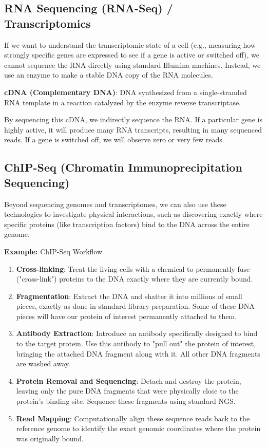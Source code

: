 \subsection{RNA Sequencing (RNA-Seq) / Transcriptomics}
If we want to understand the transcriptomic state of a cell (e.g., measuring how strongly specific genes are expressed to see if a gene is active or switched off), we cannot sequence the RNA directly using standard Illumina machines. 
Instead, we use an enzyme to make a stable DNA copy of the RNA molecules.

\begin{important}
  \textbf{cDNA (Complementary DNA)}: DNA synthesized from a single-stranded RNA template in a reaction catalyzed by the enzyme reverse transcriptase. 
\end{important}

By sequencing this cDNA, we indirectly sequence the RNA. If a particular gene is highly active, it will produce many RNA transcripts, resulting in many sequenced reads. If a gene is switched off, we will observe zero or very few reads.

\subsection{ChIP-Seq (Chromatin Immunoprecipitation Sequencing)}
Beyond sequencing genomes and transcriptomes, we can also use these technologies to investigate physical interactions, such as discovering exactly where specific proteins (like transcription factors) bind to the DNA across the entire genome.

\textbf{Example:} ChIP-Seq Workflow
\begin{enumerate}
  \item \textbf{Cross-linking}: Treat the living cells with a chemical to permanently fuse ("cross-link") proteins to the DNA exactly where they are currently bound.
  \item \textbf{Fragmentation}: Extract the DNA and shatter it into millions of small pieces, exactly as done in standard library preparation. Some of these DNA pieces will have our protein of interest permanently attached to them.
  \item \textbf{Antibody Extraction}: Introduce an antibody specifically designed to bind to the target protein. Use this antibody to "pull out" the protein of interest, bringing the attached DNA fragment along with it. All other DNA fragments are washed away.
  \item \textbf{Protein Removal and Sequencing}: Detach and destroy the protein, leaving only the pure DNA fragments that were physically close to the protein's binding site. Sequence these fragments using standard NGS.
  \item \textbf{Read Mapping}: Computationally align these sequence reads back to the reference genome to identify the exact genomic coordinates where the protein was originally bound.
\end{enumerate}

